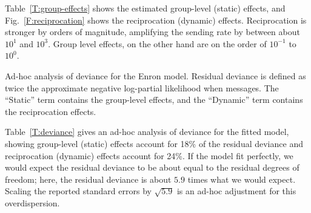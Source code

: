 \documentclass[aoas,preprint]{imsart}
\begin{document}
Table~\ref{T:group-effects} shows the estimated group-level
(static) effects, and Fig.~\ref{F:reciprocation} shows the reciprocation
(dynamic) effects.  Reciprocation is stronger by orders of magnitude,
amplifying the sending rate by between about $10^1$ and $10^3$.  Group level
effects, on the other hand are on the order of $10^{-1}$ to $10^0$.

\begin{table}[h]
    
    \caption{
        Ad-hoc analysis of deviance for the Enron model.  Residual deviance
        is defined as twice the approximate negative log-partial likelihood
        when messages.  The ``Static'' term contains the group-level effects,
        and the ``Dynamic'' term contains the reciprocation effects.
    }
    \label{T:deviance}
\end{table}

Table~\ref{T:deviance} gives an ad-hoc analysis of deviance for the fitted
model, showing group-level (static) effects account for 18\% of the
residual deviance and reciprocation (dynamic) effects account for 24\%.
If the model fit perfectly, we would expect the residual deviance to be
about equal to the residual degrees of freedom; here, the residual deviance
is about $5.9$ times what we would expect.  Scaling the reported standard errors
by $\sqrt{5.9}$ is an ad-hoc adjustment for this overdispersion.
\end{document}
